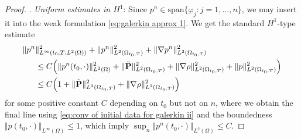 \documentclass[11pt,a4paper,reqno]{amsart}
\theoremstyle{remark}
\theoremstyle{definition}
\numberwithin{equation}{section}
\renewcommand{\P}{{\bf P}}
\begin{document}
\begin{proof}
\smallskip 

. \textit{Uniform estimates in $H^1$}: Since $p^n \in \mathrm{span}\{\varphi_j:j=1,\dots,n\}$, we may insert it into the weak formulation \eqref{eq:galerkin approx 1}. We get the standard $H^1$-type estimate 
\begin{equation}\label{eq:unif est for pn galerkin H1}
   \begin{aligned}
        \Vert p^n &\Vert_{L^\infty(t_0,T;L^2(\Omega))}^2 + \Vert p^n \Vert^2_{L^2(\Omega_{t_0,T})} + \Vert \nabla p^n \Vert^2_{L^2(\Omega_{t_0,T})} \\ 
        &\leq C \Big( \Vert p^n(t_0,\cdot) \Vert^2_{L^2(\Omega)} + \Vert \tilde{\P} \Vert^2_{L^2(\Omega_{t_0,T})} + \Vert \nabla \rho \Vert^2_{L^2(\Omega_{t_0,T})} + \Vert p \Vert^2_{L^2(\Omega_{t_0,T})} \Big) \\ 
        &\leq C \Big( 1 + \Vert \tilde{\P}\Vert^2_{L^2(\Omega_{t_0,T})} + \Vert \nabla \rho \Vert^2_{L^2(\Omega_{t_0,T})} \Big)
   \end{aligned}
\end{equation}
for some positive constant $C$ depending on $t_0$ but not on $n$, where we obtain the final line using \eqref{eq:conv of initial data for galerkin ii} and the boundedness $\Vert p(t_0,\cdot) \Vert_{L^\infty(\Omega)} \leq 1$, which imply $\sup_n \Vert p^n(t_0,\cdot) \Vert_{L^2(\Omega)} \leq C$. 


\end{proof}
\end{document}

